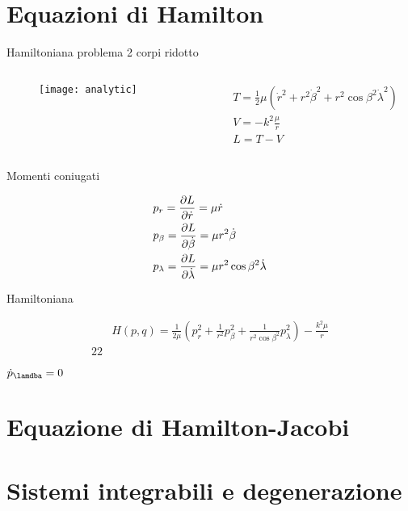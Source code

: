 \section{Equazioni di Hamilton}

\begin{frame}{Hamiltoniana problema 2 corpi ridotto}

\begin{columns}

\begin{column}{0.2\textwidth}

\begin{figure}[!ht]

\texttt{[image: analytic]}

\end{figure}


\end{column}

\begin{column}{0.8\textwidth}

\begin{align*}
&T=\frac{1}{2}\mu(\dot{r}^2+r^2\dot{\beta}^2+r^2\cos{\beta}^2\dot{\lambda}^2)\\
&V=-k^2\frac{\mu}{r}\\
&L=T-V
\end{align*}

\end{column}

\end{columns}

\begin{block}{Momenti coniugati}

\begin{align*}
&p_r=\PDy{\dot{r}}{L}=\mu\dot{r}\\
&p_{\beta}=\PDy{\dot{\beta}}{L}=\mu r^2\dot{\beta}\\
&p_{\lambda}=\PDy{\dot{\lambda}}{L}=\mu r^2\cos{\beta}^2\dot{\lambda}
\end{align*}

\end{block}

\begin{block}{Hamiltoniana}

\begin{align*}
&H(p,q)=\frac{1}{2\mu}(p_r^2+\frac{1}{r^2}p_{\beta}^2+\frac{1}{r^2\cos{\beta}^2}p_{\lambda}^2)-\frac{k^2\mu}{r}\\
22
\end{align*}

$\dot{p}_{\lamdba}=0$


\end{block}

\end{frame}


\section{Equazione di Hamilton-Jacobi}



\section{Sistemi integrabili e degenerazione}


